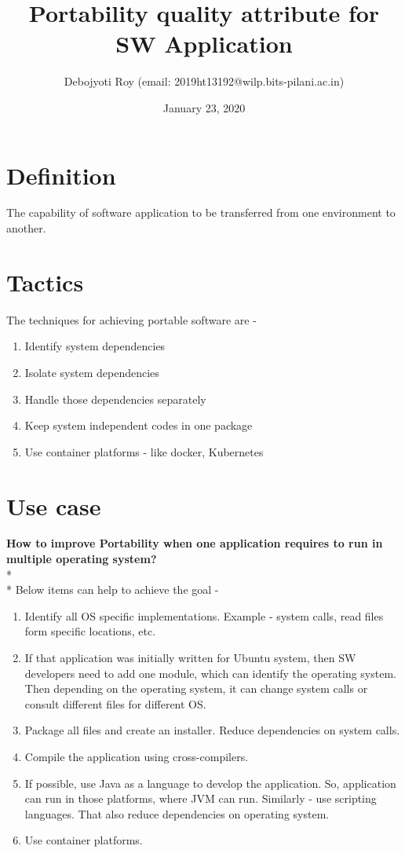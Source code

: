 \documentclass[12pt]{article}
\title{Portability quality attribute for SW Application}
\author{Debojyoti Roy (email: 2019ht13192@wilp.bits-pilani.ac.in)}
\date{January 23, 2020}
\begin{document}
\maketitle
\tableofcontents

\section{Definition}
The capability of software application to be transferred from one environment to another.

\section{Tactics}
The techniques for achieving portable software are -
\begin{enumerate}
  \item Identify system dependencies
  \item Isolate system dependencies
  \item Handle those dependencies separately
  \item Keep system independent codes in one package
  \item Use container platforms - like docker, Kubernetes
\end{enumerate}

\section{Use case}
\textbf{How to improve Portability when one application requires to run in multiple operating system?}
\\* 
\\* Below items can help to achieve the goal -
\begin{enumerate}
  \item Identify all OS specific implementations. Example - system calls, read files form specific locations, etc.
  \item If that application was initially written for Ubuntu system, then SW developers need to add one module, which can identify the operating system. Then depending on the operating system, it can change system calls or consult different files for different OS.
  \item Package all files and create an installer. Reduce dependencies on system calls.
  \item Compile the application using cross-compilers.
  \item If possible, use Java as a language to develop the application. So, application can run in those platforms, where JVM can run. Similarly - use scripting languages. That also reduce dependencies on operating system.
  \item Use container platforms.
\end{enumerate}
\end{document}
